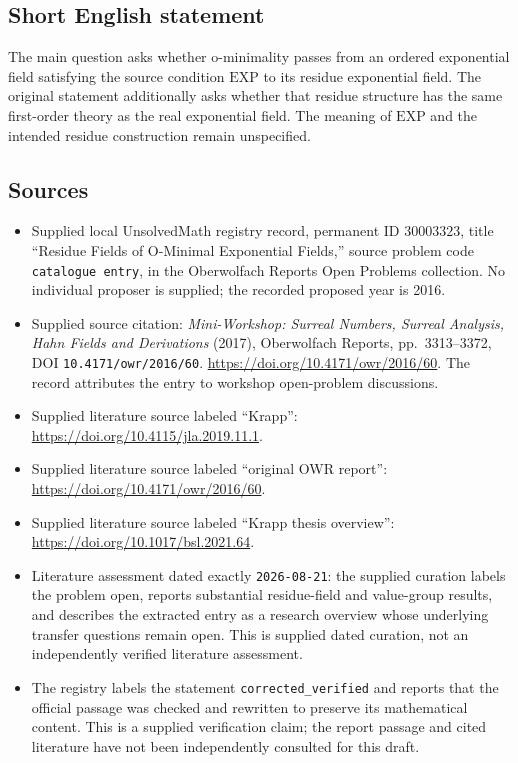 \documentclass[11pt]{article}
\begin{document}
\subsection{Short English statement}
The main question asks whether o-minimality passes from an ordered exponential field satisfying the source condition \(\mathrm{EXP}\) to its residue exponential field. The original statement additionally asks whether that residue structure has the same first-order theory as the real exponential field. The meaning of \(\mathrm{EXP}\) and the intended residue construction remain unspecified.
\subsection{Sources}
\begin{itemize}
\item Supplied local UnsolvedMath registry record, permanent ID \(30003323\), title ``Residue Fields of O-Minimal Exponential Fields,'' source problem code \texttt{catalogue entry}, in the Oberwolfach Reports Open Problems collection. No individual proposer is supplied; the recorded proposed year is 2016.
\item Supplied source citation: \emph{Mini-Workshop: Surreal Numbers, Surreal Analysis, Hahn Fields and Derivations} (2017), Oberwolfach Reports, pp.~3313--3372, DOI \texttt{10.4171/owr/2016/60}. \url{https://doi.org/10.4171/owr/2016/60}. The record attributes the entry to workshop open-problem discussions.
\item Supplied literature source labeled ``Krapp'': \url{https://doi.org/10.4115/jla.2019.11.1}.
\item Supplied literature source labeled ``original OWR report'': \url{https://doi.org/10.4171/owr/2016/60}.
\item Supplied literature source labeled ``Krapp thesis overview'': \url{https://doi.org/10.1017/bsl.2021.64}.
\item Literature assessment dated exactly \texttt{2026-08-21}: the supplied curation labels the problem open, reports substantial residue-field and value-group results, and describes the extracted entry as a research overview whose underlying transfer questions remain open. This is supplied dated curation, not an independently verified literature assessment.
\item The registry labels the statement \texttt{corrected\_verified} and reports that the official passage was checked and rewritten to preserve its mathematical content. This is a supplied verification claim; the report passage and cited literature have not been independently consulted for this draft.
\end{itemize}
\end{document}
